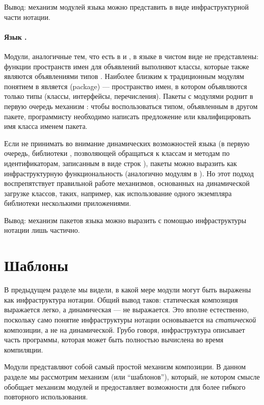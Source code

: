 Вывод: механизм модулей языка  можно представить в виде инфраструктурной части нотации.

\paragraph*{Язык .} Модули, аналогичные тем, что есть в  и , в языке  в чистом виде не представлены: функции пространств имен для объявлений выполняют классы, которые также являются объявлениями типов \cite{JLS}. Наиболее близким к традиционным модулям понятием в  является  (package) --- пространство имен, в котором объявляются только типы (классы, интерфейсы, перечисления). Пакеты с модулями роднит в первую очередь механизм : чтобы воспользоваться типом, объявленным в другом пакете, программисту необходимо написать предложение  или квалифицировать имя класса именем пакета.

Если не принимать во внимание динамических возможностей языка  (в первую очередь, библиотеки , позволяющей обращаться к классам и методам по идентификаторам, записанным в виде строк \cite{JLS}), пакеты можно выразить как инфраструктурную функциональность (аналогично модулям в ). Но этот подход воспрепятствует правильной работе механизмов, основанных на динамической загрузке классов, таких, например, как использование одного экземпляра библиотеки несколькими приложениями.

Вывод: механизм пакетов языка  можно выразить с помощью инфраструктуры нотации лишь частично.

\section{Шаблоны}

В предыдущем разделе мы видели, в какой мере модули могут быть выражены как инфраструктура нотации. Общий вывод таков: статическая композиция выражается легко, а динамическая --- не выражается. Это вполне естественно, поскольку само понятие инфраструктуры нотации основывается на \emph{статической} композиции, а не на динамической. Грубо говоря, инфраструктура описывает часть программы, которая может быть полностью вычислена во время компиляции.

Модули представляют собой самый простой механизм композиции. В данном разделе мы рассмотрим механизм  (или ``шаблонов''), который, не котором смысле обобщает механизм модулей и предоставляет возможности для более гибкого повторного использования.

